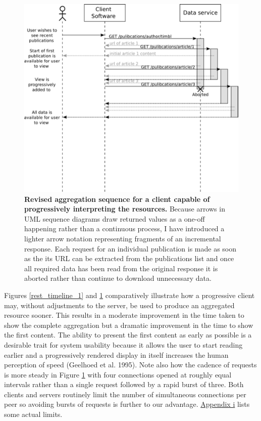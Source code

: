 \documentclass[]{article}
\makeatletter
\def\maxwidth{\ifdim\Gin@nat@width>\linewidth\linewidth
\else\Gin@nat@width\fi}
\let\Oldincludegraphics\includegraphics
\renewcommand{\includegraphics}[1]{\Oldincludegraphics[width=\maxwidth]{#1}}
\makeatother
\begin{document}
\begin{figure}[htbp]
\centering
\includegraphics{images/rest_timeline_2.png}
\caption{\textbf{Revised aggregation sequence for a client capable of
progressively interpreting the resources.} Because arrows in UML
sequence diagrams draw returned values as a one-off happening rather
than a continuous process, I have introduced a lighter arrow notation
representing fragments of an incremental response. Each request for an
individual publication is made as soon as the its URL can be extracted
from the publications list and once all required data has been read from
the original response it is aborted rather than continue to download
unnecessary data. \label{rest_timeline_2}}
\end{figure}

Figures \ref{rest_timeline_1} and \ref{rest_timeline_2} comparatively
illustrate how a progressive client may, without adjustments to the
server, be used to produce an aggregated resource sooner. This results
in a moderate improvement in the time taken to show the complete
aggregation but a dramatic improvement in the time to show the first
content. The ability to present the first content as early as possible
is a desirable trait for system usability because it allows the user to
start reading earlier and a progressively rendered display in itself
increases the human perception of speed (Geelhoed et al. 1995). Note
also how the cadence of requests is more steady in Figure
\ref{rest_timeline_2} with four connections opened at roughly equal
intervals rather than a single request followed by a rapid burst of
three. Both clients and servers routinely limit the number of
simultaneous connections per peer so avoiding bursts of requests is
further to our advantage. \hyperref[appendix_http_limits]{Appendix i}
lists some actual limits.
\end{document}
